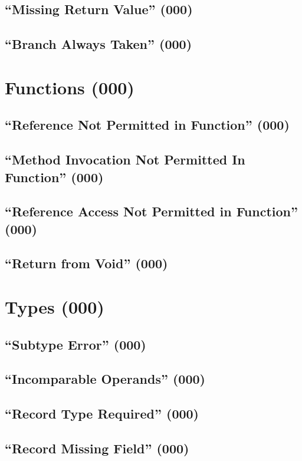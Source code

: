 \subsection{``Missing Return Value'' (000)}

\subsection{``Branch Always Taken'' (000)}

\section{Functions (000)}

\subsection{``Reference Not Permitted in Function'' (000)}

\subsection{``Method Invocation Not Permitted In Function'' (000)}

\subsection{``Reference Access Not Permitted in Function'' (000)}

\subsection{``Return from Void'' (000)}
	
\section{Types (000)}

\subsection{``Subtype Error'' (000)}

\subsection{``Incomparable Operands'' (000)}

\subsection{``Record Type Required'' (000)}

\subsection{``Record Missing Field'' (000)}


